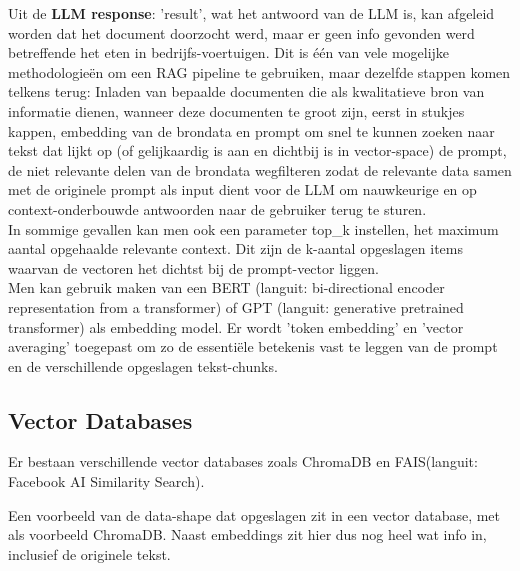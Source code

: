 Uit de \textbf{LLM response}: 'result', wat het antwoord van de LLM is, kan afgeleid worden dat het document doorzocht werd, maar er geen info gevonden werd betreffende het eten in bedrijfs-voertuigen. Dit is één van vele mogelijke methodologieën om een RAG pipeline te gebruiken, maar dezelfde stappen komen telkens terug: Inladen van bepaalde documenten die als kwalitatieve bron van informatie dienen, wanneer deze documenten te groot zijn, eerst in stukjes kappen, embedding van de brondata en prompt om snel te kunnen zoeken naar tekst dat lijkt op (of gelijkaardig is aan en dichtbij is in vector-space) de prompt, de niet relevante delen van de brondata wegfilteren zodat de relevante data samen met de originele prompt als input dient voor de LLM om nauwkeurige en op context-onderbouwde antwoorden naar de gebruiker terug te sturen. \\

In sommige gevallen kan men ook een parameter top\_k instellen, het maximum aantal opgehaalde relevante context. Dit zijn de k-aantal opgeslagen items waarvan de vectoren het dichtst bij de prompt-vector liggen. \\

Men kan gebruik maken van een BERT (languit: bi-directional encoder representation from a transformer) of GPT (languit: generative pretrained transformer) als embedding model. Er wordt 'token embedding' en 'vector averaging' toegepast om zo de essentiële betekenis vast te leggen van de prompt en de verschillende opgeslagen tekst-chunks.


\subsection{Vector Databases}
\label{ssec:vectordatabases}

Er bestaan verschillende vector databases zoals ChromaDB en FAIS(languit: Facebook AI Similarity Search).

Een voorbeeld van de data-shape dat opgeslagen zit in een vector database, met als voorbeeld ChromaDB. Naast embeddings zit hier dus nog heel wat info in, inclusief de originele tekst.

